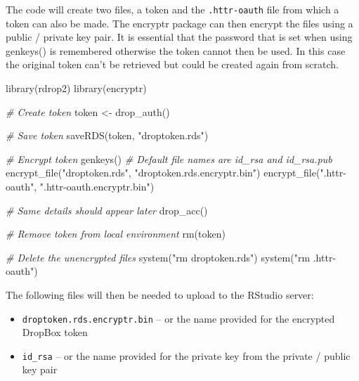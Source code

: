 \documentclass[
]{book}
\newenvironment{Shaded}{\begin{snugshade}}{\end{snugshade}}
\newcommand{\CommentTok}[1]{\textcolor[rgb]{0.56,0.35,0.01}{\textit{#1}}}
\newcommand{\FunctionTok}[1]{\textcolor[rgb]{0.00,0.00,0.00}{#1}}
\newcommand{\NormalTok}[1]{#1}
\newcommand{\OtherTok}[1]{\textcolor[rgb]{0.56,0.35,0.01}{#1}}
\newcommand{\StringTok}[1]{\textcolor[rgb]{0.31,0.60,0.02}{#1}}
\providecommand{\tightlist}{%
  \setlength{\itemsep}{0pt}\setlength{\parskip}{0pt}}
\begin{document}
The code will create two files, a token and the \texttt{.httr-oauth} file from which a token can also be made. The encryptr package can then encrypt the files using a public / private key pair. It is essential that the password that is set when using genkeys() is remembered otherwise the token cannot then be used. In this case the original token can't be retrieved but could be created again from scratch.

\begin{Shaded}
\begin{Highlighting}[]
\FunctionTok{library}\NormalTok{(rdrop2)}
\FunctionTok{library}\NormalTok{(encryptr)}
 
\CommentTok{\# Create token}
\NormalTok{token }\OtherTok{\textless{}{-}} \FunctionTok{drop\_auth}\NormalTok{()}
 
\CommentTok{\# Save token}
\FunctionTok{saveRDS}\NormalTok{(token, }\StringTok{"droptoken.rds"}\NormalTok{)}
 
\CommentTok{\# Encrypt token}
\FunctionTok{genkeys}\NormalTok{()               }\CommentTok{\# Default file names are id\_rsa and id\_rsa.pub}
\FunctionTok{encrypt\_file}\NormalTok{(}\StringTok{"droptoken.rds"}\NormalTok{, }\StringTok{"droptoken.rds.encryptr.bin"}\NormalTok{)}
\FunctionTok{encrypt\_file}\NormalTok{(}\StringTok{".httr{-}oauth"}\NormalTok{, }\StringTok{".httr{-}oauth.encryptr.bin"}\NormalTok{)}
 
\CommentTok{\# Same details should appear later}
\FunctionTok{drop\_acc}\NormalTok{()}
 
\CommentTok{\# Remove token from local environment}
\FunctionTok{rm}\NormalTok{(token)}
 
 
\CommentTok{\# Delete the unencrypted files}
\FunctionTok{system}\NormalTok{(}\StringTok{"rm droptoken.rds"}\NormalTok{)}
\FunctionTok{system}\NormalTok{(}\StringTok{"rm .httr{-}oauth"}\NormalTok{)}
\end{Highlighting}
\end{Shaded}

The following files will then be needed to upload to the RStudio server:

\begin{itemize}
\tightlist
\item
  \texttt{droptoken.rds.encryptr.bin} -- or the name provided for the encrypted DropBox token
\item
  \texttt{id\_rsa} -- or the name provided for the private key from the private / public key pair
\end{itemize}
\end{document}
